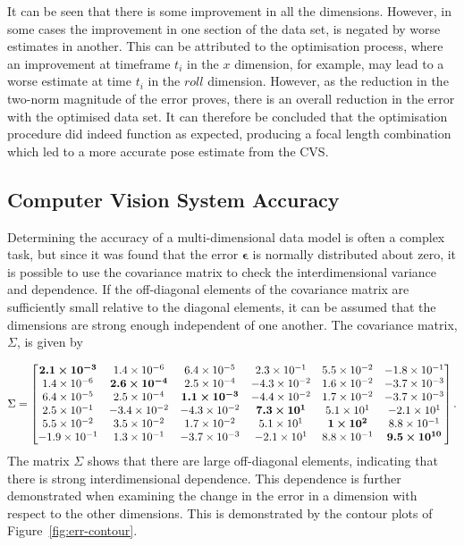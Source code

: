 It can be seen that there is some improvement in all the dimensions. However, in some cases the improvement in one section of the data set, is negated by worse estimates in another. This can be attributed to the optimisation process, where an improvement at timeframe $t_i$ in the $x$ dimension, for example, may lead to a worse estimate at time $t_i$ in the $roll$ dimension. However, as the reduction in the two-norm magnitude of the error proves, there is an overall reduction in the error with the optimised data set. It can therefore be concluded that the optimisation procedure did indeed function as expected, producing a focal length combination which led to a more accurate pose estimate from the CVS. 

\subsection{Computer Vision System Accuracy}

Determining the accuracy of a multi-dimensional data model is often a complex task, but since it was found that the error $\bm{\epsilon}$ is normally distributed about zero, it is possible to use the covariance matrix to check the interdimensional variance and dependence. If the off-diagonal elements of the covariance matrix are sufficiently small relative to the diagonal elements, it can be assumed that the dimensions are strong enough independent of one another. The covariance matrix, $\Sigma$, is given by  

\begin{equation}
  \label{eq:covariance-matrix}
  \Sigma = 
  \begin{bmatrix}
    \bm{2.1\times 10^{-3}} & 1.4\times 10^{-6}      & 6.4\times 10^{-5}       & 2.3\times 10^{-1}     &  5.5\times 10^{-2}   & -1.8\times 10^{-1}     \\ 
    1.4\times 10^{-6}      & \bm{2.6\times 10^{-4}} & 2.5\times 10^{-4}       & -4.3\times 10^{-2}    &  1.6\times 10^{-2}   & -3.7\times 10^{-3}     \\
    6.4\times 10^{-5}      & 2.5\times 10^{-4}      & \bm{1.1\times 10^{-3}}  & -4.4\times 10^{-2}    &  1.7\times 10^{-2}   & -3.7\times 10^{-3}     \\
    2.5\times 10^{-1}      & -3.4\times 10^{-2}     & -4.3\times 10^{-2}      & \bm{7.3\times 10^{1}} &  5.1\times 10^{1}    & -2.1\times 10^{1}      \\
    5.5\times 10^{-2}      & 3.5\times 10^{-2}      & 1.7\times 10^{-2}       & 5.1\times 10^{1}      &  \bm{1\times 10^{2}} & 8.8\times 10^{-1}      \\
    -1.9\times 10^{-1}     & 1.3\times 10^{-1}      & -3.7\times 10^{-3}      & -2.1\times 10^{1}     &  8.8\times 10^{-1}   & \bm{9.5\times 10^{10}} \\
  \end{bmatrix}.
\end{equation}
The matrix $\Sigma$ shows that there are large off-diagonal elements, indicating that there is strong interdimensional dependence. This dependence is further demonstrated when examining the change in the error in a dimension with respect to the other dimensions. This is demonstrated by the contour plots of Figure~\ref{fig:err-contour}. 

